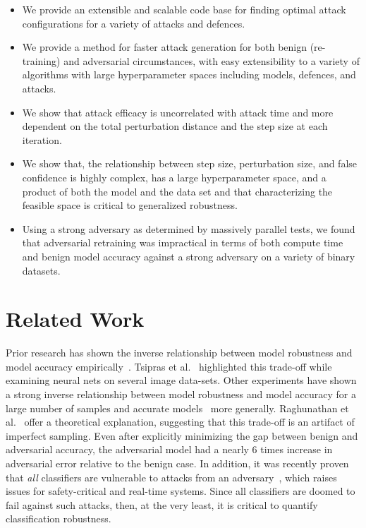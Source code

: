 \documentclass[fonts]{icst}
\begin{document}
\begin{itemize}

    \item We provide an extensible and scalable code base for finding optimal attack configurations for a variety of attacks and defences.

    \item  We provide a method for faster attack generation for both benign (re-training) and adversarial circumstances, with easy extensibility to a variety of algorithms with large hyperparameter spaces including  models, defences, and attacks.
    
    \item We show that attack efficacy is uncorrelated with attack time and more dependent on the total perturbation distance and the step size at each iteration.

    \item We show that, the relationship between step size, perturbation size, and false confidence is highly complex, has a large hyperparameter space, and a product of both the model and the data set and that characterizing the feasible space is critical to generalized robustness.

    \item Using a strong adversary as determined by massively parallel tests, we found that adversarial retraining was impractical in terms of both compute time and benign model accuracy against a strong adversary on a variety of binary datasets.
    
\end{itemize}

\section{Related Work}

Prior research has shown the inverse relationship between model robustness and model accuracy empirically~\cite{li2016general,tsipras2018robustness}. Tsipras et al.~\cite{tsipras2018robustness} highlighted this trade-off while examining neural nets on several image data-sets. Other experiments have shown a strong inverse relationship between model robustness and model accuracy for a large number of samples and accurate models~\cite{raghunathan2020understanding} more generally.
Raghunathan et al.~\cite{raghunathan2020understanding} offer a theoretical explanation, suggesting that this trade-off is an artifact of imperfect sampling. Even after explicitly minimizing the gap between benign and adversarial accuracy, the adversarial model had a nearly 6 times increase in adversarial error relative to the benign case. In addition, it was recently proven that \textit{all} classifiers are vulnerable to attacks from an adversary~\cite{dohmatob2019generalized}, which raises issues for safety-critical and real-time systems. Since all classifiers are doomed to fail against such attacks, then, at the very least, it is critical to quantify classification robustness.
\end{document}
